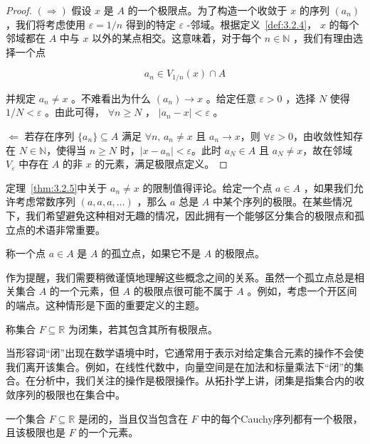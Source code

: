 \begin{proof}
  \(\left(  \Rightarrow  \right)\) 假设 \(x\) 是 \(A\) 的一个极限点。为了构造一个收敛于 \(x\) 的序列 \(\left( {a}_{n}\right)\) ，我们将考虑使用 \(\varepsilon  = 1/n\) 得到的特定 \(\varepsilon\) -邻域。根据定义~\ref{def:3.2.4}， \(x\) 的每个邻域都在 \(A\) 中与 \(x\) 以外的某点相交。这意味着，对于每个 \(n \in  \mathbb{N}\) ，我们有理由选择一个点

\[
{a}_{n} \in  {V}_{1/n}\left( x\right)  \cap  A
\]

并规定 \({a}_{n} \neq  x\) 。不难看出为什么 \(\left( {a}_{n}\right)  \rightarrow  x\) 。给定任意 \(\varepsilon  > 0\) ，选择 \(N\) 使得 \(1/N < \varepsilon\) 。由此可得， \( \forall n \geq  N\) ， \(\left| {{a}_{n} - x}\right|  < \varepsilon\) 。

$\Leftarrow$ 若存在序列 \(\{a_n\} \subseteq A\) 满足 \(\forall n,\, a_n \neq x\) 且  \(a_n \to x\)，则 \(\forall \varepsilon > 0\)，由收敛性知存在 \(N \in \mathbb{N}\)，使得当 \(n \geq N\) 时，\(|x - a_n| < \varepsilon\)。此时 \(a_N \in A\) 且 \(a_N \neq x\)，故在邻域 \(V_{\varepsilon}\) 中存在 \(A\) 的非 \(x\) 的元素，满足极限点定义。
\end{proof}


定理~\ref{thm:3.2.5}中关于 \({a}_{n} \neq  x\) 的限制值得评论。给定一个点 \(a \in  A\) ，如果我们允许考虑常数序列 \(\left( {a,a,a,\ldots }\right)\) ，那么 \(a\) 总是 \(A\) 中某个序列的极限。在某些情况下，我们希望避免这种相对无趣的情况，因此拥有一个能够区分集合的极限点和孤立点的术语非常重要。

\begin{Def}
  \label{def:3.2.6}
  称一个点 \(a \in  A\) 是 \(A\) 的孤立点，如果它不是 \(A\) 的极限点。
\end{Def}


作为提醒，我们需要稍微谨慎地理解这些概念之间的关系。虽然一个孤立点总是相关集合 \(A\) 的一个元素，但 \(A\) 的极限点很可能不属于 \(A\) 。例如，考虑一个开区间的端点。这种情形是下面的重要定义的主题。

\begin{Def}
  \label{def:3.2.7}
  称集合 \(F \subseteq  \mathbb{R}\) 为闭集，若其包含其所有极限点。
\end{Def}

当形容词“闭”出现在数学语境中时，它通常用于表示对给定集合元素的操作不会使我们离开该集合。例如，在线性代数中，向量空间是在加法和标量乘法下“闭”的集合。在分析中，我们关注的操作是极限操作。从拓扑学上讲，闭集是指集合内的收敛序列的极限也在集合中。

\begin{Thm}
  \label{thm:3.2.8}
  一个集合 \(F \subseteq  \mathbb{R}\) 是闭的，当且仅当包含在 \(F\) 中的每个Cauchy序列都有一个极限，且该极限也是 \(F\) 的一个元素。
\end{Thm}

